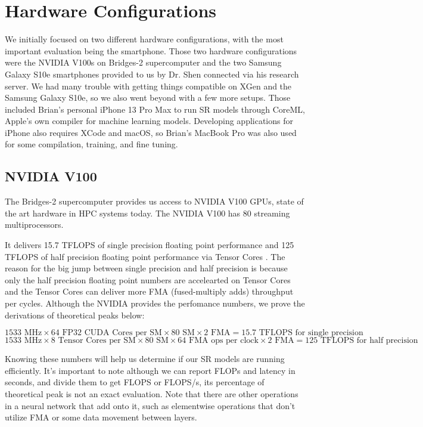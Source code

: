 \documentclass{article}
\begin{document}
\section{Hardware Configurations}
We initially focused on two different hardware configurations, with the most important evaluation being the smartphone. Those two hardware configurations were the NVIDIA V100s on Bridges-2 supercomputer \cite{bridges-2} and the two Samsung Galaxy S10e smartphones provided to us by Dr. Shen connected via his research server. We had many trouble with getting things compatible on XGen and the Samsung Galaxy S10e, so we also went beyond with a few more setups. Those included Brian's personal iPhone 13 Pro Max to run SR models through CoreML, Apple's own compiler for machine learning models. Developing applications for iPhone also requires XCode and macOS, so Brian's MacBook Pro was also used for some compilation, training, and fine tuning.

\subsection{NVIDIA V100}
The Bridges-2 supercomputer provides us access to NVIDIA V100 GPUs, state of the art hardware in HPC systems today. The NVIDIA V100 has 80 streaming multiprocessors.

It delivers 15.7 TFLOPS of single precision floating point performance and 125 TFLOPS of half precision floating point performance via Tensor Cores \cite{v100}. The reason for the big jump between single precision and half precision is because only the half precision floating point numbers are accelearted on Tensor Cores and the Tensor Cores can deliver more FMA (fused-multiply adds) throughput per cycles. Although the NVIDIA provides the perfomance numbers, we prove the derivations of theoretical peaks below:

$$1533 \text{ MHz} \times 64 \text{ FP32 CUDA Cores per SM} \times 80 \text{ SM} \times 2 \text{ FMA} = 15.7 \text{ TFLOPS for single precision}$$
$$1533 \text{ MHz} \times 8 \text{ Tensor Cores per SM} \times 80 \text{ SM} \times 64 \text{ FMA ops per clock} \times 2 \text{ FMA} = 125 \text{ TFLOPS for half precision}$$

Knowing these numbers will help us determine if our SR models are running efficiently. It's important to note although we can report FLOPs and latency in seconds, and divide them to get FLOPS or FLOPS/s, its percentage of theoretical peak is not an exact evaluation. Note that there are other operations in a neural network that add onto it, such as elementwise operations that don't utilize FMA or some data movement between layers.
\end{document}
